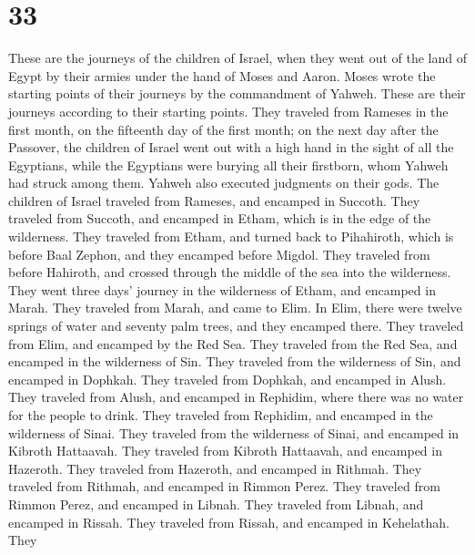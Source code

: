 \hypertarget{section-32}{%
\section{33}\label{section-32}}

 These are the journeys of the children of Israel, when they
went out of the land of Egypt by their armies under the hand of Moses
and Aaron.  Moses wrote the starting points of their
journeys by the commandment of Yahweh. These are their journeys
according to their starting points.  They traveled from
Rameses in the first month, on the fifteenth day of the first month; on
the next day after the Passover, the children of Israel went out with a
high hand in the sight of all the Egyptians,  while the
Egyptians were burying all their firstborn, whom Yahweh had struck among
them. Yahweh also executed judgments on their gods.  The
children of Israel traveled from Rameses, and encamped in Succoth.
 They traveled from Succoth, and encamped in Etham, which is
in the edge of the wilderness.  They traveled from Etham,
and turned back to Pihahiroth, which is before Baal Zephon, and they
encamped before Migdol.  They traveled from before Hahiroth,
and crossed through the middle of the sea into the wilderness. They went
three days' journey in the wilderness of Etham, and encamped in Marah.
 They traveled from Marah, and came to Elim. In Elim, there
were twelve springs of water and seventy palm trees, and they encamped
there.  They traveled from Elim, and encamped by the Red
Sea.  They traveled from the Red Sea, and encamped in the
wilderness of Sin.  They traveled from the wilderness of
Sin, and encamped in Dophkah.  They traveled from Dophkah,
and encamped in Alush.  They traveled from Alush, and
encamped in Rephidim, where there was no water for the people to drink.
 They traveled from Rephidim, and encamped in the
wilderness of Sinai.  They traveled from the wilderness of
Sinai, and encamped in Kibroth Hattaavah.  They traveled
from Kibroth Hattaavah, and encamped in Hazeroth.  They
traveled from Hazeroth, and encamped in Rithmah.  They
traveled from Rithmah, and encamped in Rimmon Perez.  They
traveled from Rimmon Perez, and encamped in Libnah.  They
traveled from Libnah, and encamped in Rissah.  They
traveled from Rissah, and encamped in Kehelathah.  They
